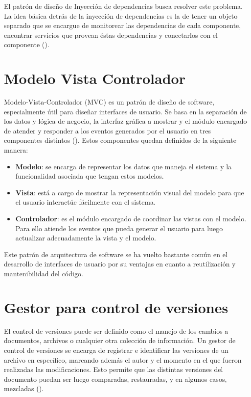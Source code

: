 El patrón de diseño de Inyección de dependencias busca resolver este problema. La
idea básica detrás de la inyección de dependencias es la de tener un objeto separado
que se encargue de monitorear las dependencias de cada componente, encontrar
servicios que provean éstas dependencias y conectarlos con el componente (\cite{INYECCION}).

\section{Modelo Vista Controlador}
Modelo-Vista-Controlador (MVC) es un patrón de diseño de software, especialmente útil
para diseñar interfaces de usuario. Se basa en la separación de los datos y lógica de
negocio, la interfaz gráfica a mostrar y el módulo encargado de atender y responder a
los eventos generados por el usuario en tres componentes distintos (\cite{MVC}). Estos
componentes quedan definidos de la siguiente manera:

\begin{itemize}
  \item \textbf{Modelo}: se encarga de representar los datos que maneja el sistema y
  la funcionalidad asociada que tengan estos modelos.
  \item \textbf{Vista}: está a cargo de mostrar la representación visual del modelo
  para que el usuario interactúe fácilmente con el sistema.
  \item \textbf{Controlador}: es el módulo encargado de coordinar las vistas con el modelo.
  Para ello atiende los eventos que pueda generar el usuario para luego actualizar
  adecuadamente la vista y el modelo.
\end{itemize}

Este patrón de arquitectura de software se ha vuelto bastante común en el desarrollo
de interfaces de usuario por su ventajas en cuanto a reutilización y mantenibilidad
del código.

\section{Gestor para control de versiones}

El control de versiones puede ser definido como el manejo de los cambios a documentos,
archivos o cualquier otra colección de información. Un gestor de control de versiones
se encarga de registrar e identificar las versiones de un archivo en específico, marcando
además el autor y el momento en el que fueron realizadas las modificaciones. Esto permite
que las distintas versiones del documento puedan ser luego comparadas, restauradas, y en
algunos casos, mezcladas (\cite{VERSION}).
